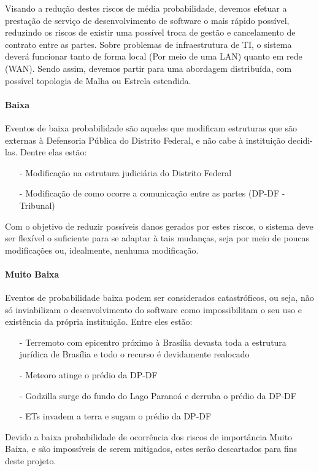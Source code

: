 \documentclass[12pt,a4paper]{report}
\begin{document}
Visando a redução destes riscos de média probabilidade, devemos efetuar a prestação de serviço de desenvolvimento de software o mais rápido possível, reduzindo os riscos de existir uma possível troca de gestão e cancelamento de contrato entre as partes.
Sobre problemas de infraestrutura de TI, o sistema deverá funcionar tanto de forma local (Por meio de uma LAN) quanto em rede (WAN). Sendo assim, devemos partir para uma abordagem distribuída, com possível topologia de Malha ou Estrela estendida.

\paragraph{Baixa} Eventos de baixa probabilidade são aqueles que modificam estruturas que são externas à Defensoria Pública do Distrito Federal, e não cabe à instituição decidi-las. Dentre elas estão:
\begin{itemize}
\item [-] Modificação na estrutura judiciária do Distrito Federal
\item [-] Modificação de como ocorre a comunicação entre as partes (DP-DF - Tribunal)
\end{itemize}

Com o objetivo de reduzir possíveis danos gerados por estes riscos, o sistema deve ser flexível o suficiente para se adaptar à tais mudanças, seja por meio de poucas modificações ou, idealmente, nenhuma modificação.

\paragraph{Muito Baixa} Eventos de probabilidade baixa podem ser considerados catastróficos, ou seja, não só inviabilizam o desenvolvimento do software como impossibilitam o seu uso e existência da própria instituição. Entre eles estão:
\begin{itemize}
\item [-] Terremoto com epicentro próximo à Brasília devasta toda a estrutura jurídica de Brasília e todo o recurso é devidamente realocado
\item [-] Meteoro atinge o prédio da DP-DF
\item [-] Godzilla surge do fundo do Lago Paranoá e derruba o prédio da DP-DF
\item [-] ETs invadem a terra e sugam o prédio da DP-DF
\end{itemize}


Devido a baixa probabilidade de ocorrência dos riscos de importância Muito Baixa, e são impossíveis de serem mitigados, estes serão descartados para fins deste projeto. 



\end{document}

